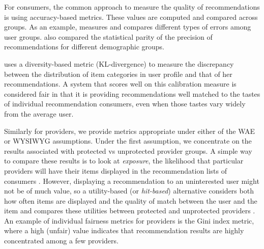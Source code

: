 
For consumers, the common approach to measure the quality of recommendations is using accuracy-based metrics. These values are computed and compared across groups. As an example, \cite{yao2017beyond} measures and compares different types of errors among user groups. \cite{burke2018balanced} also compared the statistical parity of the precision of recommendations for different demographic groups. 


\cite{steck2018calibrated} uses a diversity-based metric (KL-divergence) to measure the discrepancy between the distribution of item categories in user profile and that of her recommendations. A system that scores well on this calibration measure is considered fair in that it is providing recommendations well matched to the tastes of individual recommendation consumers, even when those tastes vary widely from the average user.

Similarly for providers, we provide metrics appropriate under either of the WAE or WYSIWYG assumptions. Under the first assumption, we concentrate on the results associated with protected vs unprotected provider groups. A simple way to compare these results is to look at \textit{exposure}, the likelihood that particular providers will have their items displayed in the recommendation lists of consumers \cite{liu2019farpfar,sonboli2020opportunistic}. However, displaying a recommendation to an uninterested user might not be of much value, so a utility-based (or \textit{hit-based}) alternative considers both how often items are displayed and the quality of match between the user and the item and compares these utilities between protected and unprotected providers \cite{singh2018fairness,biega2018equity}. An example of individual fairness metrics for providers is the Gini index metric, where a high (unfair) value indicates that recommendation results are highly concentrated among a few providers.

